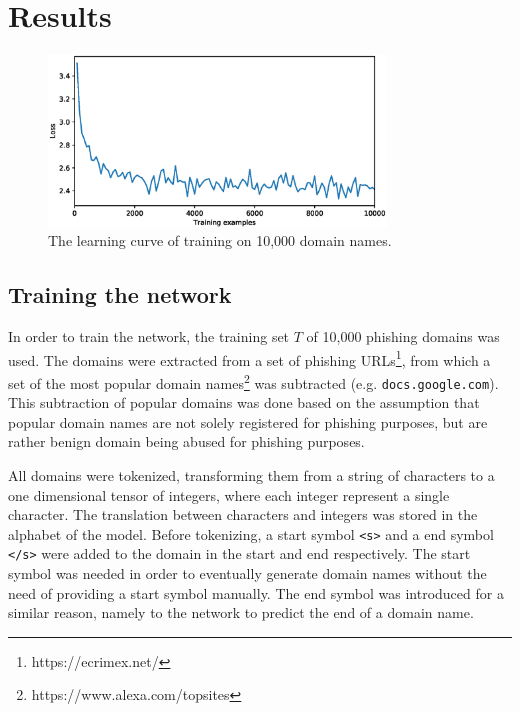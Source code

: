 \section{Results}

\begin{figure}[t]
	\centering
	\includegraphics[width=0.8\textwidth]{figures/learning_curve.eps}
	\caption{The learning curve of training on 10,000 domain names.}
	\label{fig:learning_curve}
\end{figure}

\subsection{Training the network}
In order to train the network, the training set $T$ of 10,000 phishing domains was used. 
The domains were extracted from a set of phishing URLs\footnote{https://ecrimex.net/}, from which a set of the most popular domain names\footnote{https://www.alexa.com/topsites} was subtracted (e.g. {\tt docs.google.com}).
This subtraction of popular domains was done based on the assumption that popular domain names are not solely registered for phishing purposes, but are rather benign domain being abused for phishing purposes.

All domains were tokenized, transforming them from a string of characters to a one dimensional tensor of integers, where each integer represent a single character. 
The translation between characters and integers was stored in the alphabet of the model.
Before tokenizing, a start symbol {\tt <s>} and a end symbol {\tt </s>} were added to the domain in the start and end respectively. 
The start symbol was needed in order to eventually generate domain names without the need of providing a start symbol manually.
The end symbol was introduced for a similar reason, namely to the network to predict the end of a domain name.


